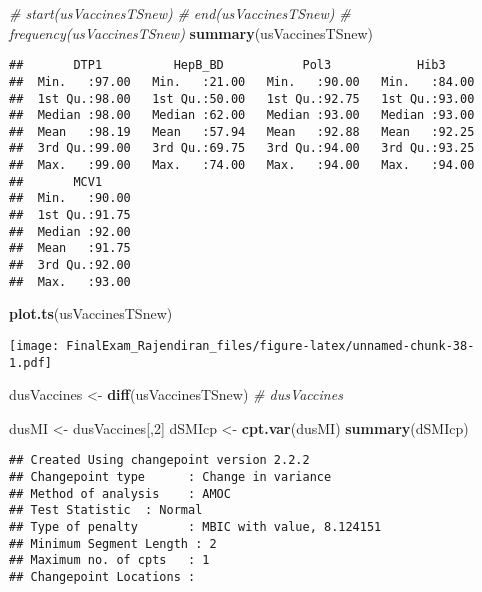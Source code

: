 \documentclass[]{article}
\newenvironment{Shaded}{\begin{snugshade}}{\end{snugshade}}
\newcommand{\CommentTok}[1]{\textcolor[rgb]{0.56,0.35,0.01}{\textit{#1}}}
\newcommand{\DecValTok}[1]{\textcolor[rgb]{0.00,0.00,0.81}{#1}}
\newcommand{\KeywordTok}[1]{\textcolor[rgb]{0.13,0.29,0.53}{\textbf{#1}}}
\newcommand{\NormalTok}[1]{#1}
\newcommand{\StringTok}[1]{\textcolor[rgb]{0.31,0.60,0.02}{#1}}
\begin{document}
\begin{Shaded}
\begin{Highlighting}[]
\CommentTok{# start(usVaccinesTSnew)}
\CommentTok{# end(usVaccinesTSnew)}
\CommentTok{# frequency(usVaccinesTSnew)}
\KeywordTok{summary}\NormalTok{(usVaccinesTSnew)}
\end{Highlighting}
\end{Shaded}

\begin{verbatim}
##       DTP1          HepB_BD           Pol3            Hib3      
##  Min.   :97.00   Min.   :21.00   Min.   :90.00   Min.   :84.00  
##  1st Qu.:98.00   1st Qu.:50.00   1st Qu.:92.75   1st Qu.:93.00  
##  Median :98.00   Median :62.00   Median :93.00   Median :93.00  
##  Mean   :98.19   Mean   :57.94   Mean   :92.88   Mean   :92.25  
##  3rd Qu.:99.00   3rd Qu.:69.75   3rd Qu.:94.00   3rd Qu.:93.25  
##  Max.   :99.00   Max.   :74.00   Max.   :94.00   Max.   :94.00  
##       MCV1      
##  Min.   :90.00  
##  1st Qu.:91.75  
##  Median :92.00  
##  Mean   :91.75  
##  3rd Qu.:92.00  
##  Max.   :93.00
\end{verbatim}

\begin{Shaded}
\begin{Highlighting}[]
\KeywordTok{plot.ts}\NormalTok{(usVaccinesTSnew)}
\end{Highlighting}
\end{Shaded}

\texttt{[image: FinalExam\_Rajendiran\_files/figure-latex/unnamed-chunk-38-1.pdf]}

\begin{Shaded}
\begin{Highlighting}[]
\NormalTok{dusVaccines <-}\StringTok{ }\KeywordTok{diff}\NormalTok{(usVaccinesTSnew)}
\CommentTok{# dusVaccines}

\NormalTok{dusMI <-}\StringTok{ }\NormalTok{dusVaccines[,}\DecValTok{2}\NormalTok{]}
\NormalTok{dSMIcp <-}\StringTok{ }\KeywordTok{cpt.var}\NormalTok{(dusMI)}
\KeywordTok{summary}\NormalTok{(dSMIcp)}
\end{Highlighting}
\end{Shaded}

\begin{verbatim}
## Created Using changepoint version 2.2.2 
## Changepoint type      : Change in variance 
## Method of analysis    : AMOC 
## Test Statistic  : Normal 
## Type of penalty       : MBIC with value, 8.124151 
## Minimum Segment Length : 2 
## Maximum no. of cpts   : 1 
## Changepoint Locations :
\end{verbatim}
\end{document}
